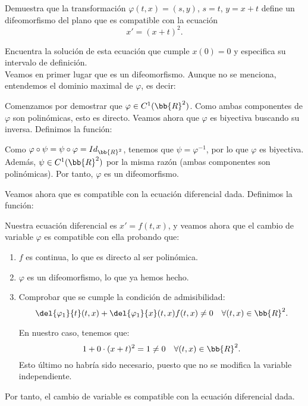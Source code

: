 \documentclass[12pt]{article}
\begin{document}
\begin{ejercicio}
    Demuestra que la transformación \(\varphi(t, x) = (s, y)\), \(s = t\), \(y = x + t\) define un difeomorfismo del plano que es compatible con la ecuación
    \[
        x' = (x + t)^2.
    \]

    Encuentra la solución de esta ecuación que cumple \(x(0) = 0\) y especifica su intervalo de definición.\\

    Veamos en primer lugar que es un difeomorfismo.
    Aunque no se menciona, entendemos el dominio maximal de $\varphi$, es decir:

    Comenzamos por demostrar que $\varphi\in C^1(\bb{R}^2)$. Como ambas componentes de $\varphi$ son polinómicas, esto es directo. Veamos ahora que $\varphi$ es biyectiva buscando su inversa.
    Definimos la función:

    Como $\varphi\circ \psi = \psi\circ \varphi = Id_{\bb{R}^2}$, tenemos que $\psi=\varphi^{-1}$, por lo que $\varphi$ es biyectiva. Además, $\psi\in C^1(\bb{R}^2)$ por la misma razón (ambas componentes son polinómicas).
    Por tanto, $\varphi$ es un difeomorfismo. 
    
    Veamos ahora que es compatible con la ecuación diferencial dada. Definimos la función:

    Nuestra ecuación diferencial es $x' = f(t,x)$, y veamos ahora que el cambio de variable $\varphi$ es compatible con ella probando que:
    \begin{enumerate}
        \item $f$ es continua, lo que es directo al ser polinómica.
        \item $\varphi$ es un difeomorfismo, lo que ya hemos hecho.
        \item Comprobar que se cumple la condición de admisibilidad:
        \begin{equation*}
            \del{\varphi_1}{t}(t,x)+ \del{\varphi_1}{x}(t,x)f(t,x) \neq 0 \quad \forall (t,x)\in \bb{R}^2.
        \end{equation*}

        En nuestro caso, tenemos que:
        \begin{equation*}
            1+0\cdot (x+t)^2 = 1 \neq 0 \quad \forall (t,x)\in \bb{R}^2.
        \end{equation*}
        Esto último no habría sido necesario, puesto que no se modifica la variable independiente.
    \end{enumerate}
    Por tanto, el cambio de variable es compatible con la ecuación diferencial dada.\\


\end{ejercicio}
\end{document}
